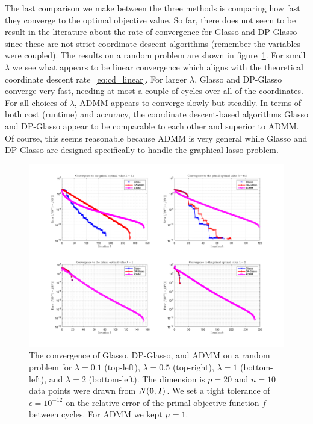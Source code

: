 \documentclass[10pt, letterpaper]{article}
\newcommand{\eye}{\boldsymbol I} %
\newcommand{\bzero}{{\bf 0}}
\begin{document}
The last comparison we make between the three methods is comparing how fast they converge to the optimal objective value.  So far, there does not seem to be result in the literature about the rate of convergence for Glasso and DP-Glasso since these are not strict coordinate descent algorithms (remember the variables were coupled).  The results on a random problem are shown in figure~\ref{fig:convergence}.  For small $\lambda$ we see what appears to be linear convergence which aligns with the theoretical coordinate descent rate~\ref{eq:cd_linear}.  For larger $\lambda$, Glasso and DP-Glasso converge very fast, needing at most a couple of cycles over all of the coordinates.  For all choices of $\lambda$, ADMM appears to converge slowly but steadily.  In terms of both cost (runtime) and accuracy, the coordinate descent-based algorithms Glasso and DP-Glasso appear to be comparable to each other and superior to ADMM.  Of course, this seems reasonable because ADMM is very general while Glasso and DP-Glasso are designed specifically to handle the graphical lasso problem.\\


\begin{figure}
\centering
\includegraphics[width=\textwidth]{plots/convergence.png}
\caption{The convergence of Glasso, DP-Glasso, and ADMM on a random problem for $\lambda = 0.1$ (top-left), $\lambda = 0.5$ (top-right), $\lambda = 1$ (bottom-left), and $\lambda = 2$ (bottom-left).  The dimension is $p=20$ and $n=10$ data points were drawn from $N(\bzero, \eye)$.  We set a tight tolerance of $\epsilon = 10^{-12}$ on the relative error of the primal objective function $f$ between cycles.  For ADMM we kept $\mu=1$.}
\label{fig:convergence}
\end{figure}
\end{document}
